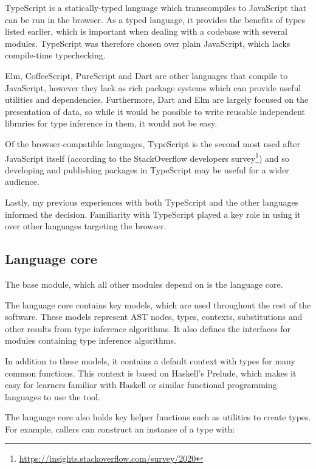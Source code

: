 \documentclass[a4paper,fleqn,oneside,12pt]{report}
\begin{document}
TypeScript is a statically-typed language which transcompiles to JavaScript that can be run in the browser. As a typed language, it provides the benefits of types listed earlier, which is important when dealing with a codebase with several modules. TypeScript was therefore chosen over plain JavaScript, which lacks compile-time typechecking.

Elm, CoffeeScript, PureScript and Dart are other languages that compile to JavaScript, however they lack as rich package systems which can provide useful utilities and dependencies. Furthermore, Dart and Elm are largely focused on the presentation of data, so while it would be possible to write reusable independent libraries for type inference in them, it would not be easy.

Of the browser-compatible languages, TypeScript is the second most used after JavaScript itself (according to the StackOverflow developers survey\footnote{\underline{\href{https://insights.stackoverflow.com/survey/2020\#technology-programming-scripting-and-markup-languages}{https://insights.stackoverflow.com/survey/2020}}}) and so developing and publishing packages in TypeScript may be useful for a wider audience.

Lastly, my previous experiences with both TypeScript and the other languages informed the decision. Familiarity with TypeScript played a key role in using it over other languages targeting the browser.

\subsection{Language core}\label{id:h.hggmfighusoc}

The base module, which all other modules depend on is the language core.

The language core contains key models, which are used throughout the rest of the software. These models represent AST nodes, types, contexts, substitutions and other results from type inference algorithms. It also defines the interfaces for modules containing type inference algorithms.

In addition to these models, it contains a default context with types for many common functions. This context is based on Haskell's Prelude, which makes it easy for learners familiar with Haskell or similar functional programming languages to use the tool.

The language core also holds key helper functions such as utilities to create types. For example, callers can construct an instance of a type with:
\end{document}
